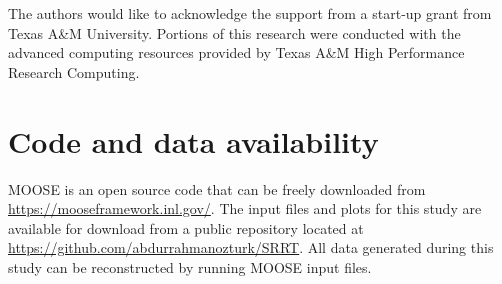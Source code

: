 \documentclass[utf8]{frontiersSCNS} %
\begin{document}
The authors would like to acknowledge the support from a start-up grant from Texas A\&M University. Portions of this research were conducted with the advanced computing resources provided by Texas A\&M High Performance Research Computing.         

\section*{Code and data availability}

MOOSE is an open source code that can be freely downloaded from \href{https://mooseframework.inl.gov/}{https://mooseframework.inl.gov/}. The input files and plots for this study are available for download from a public repository located at
\href{https://github.com/abdurrahmanozturk/SRRT}{https://github.com/abdurrahmanozturk/SRRT}. All data generated during this study can be reconstructed by running MOOSE input files.
\clearpage


\end{document}

